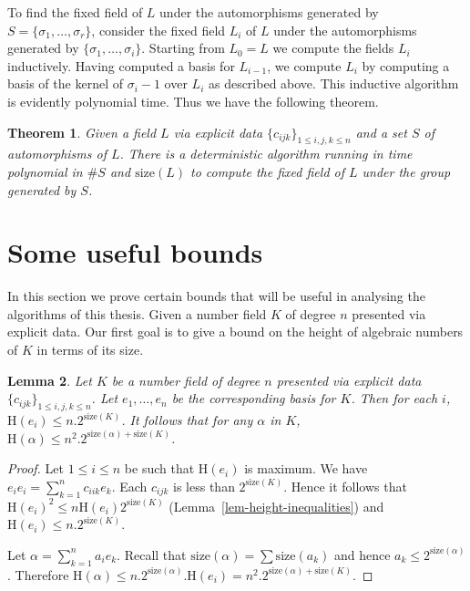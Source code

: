 \documentclass[11pt]{madras}%
\newtheorem{theorem}{Theorem}[chapter]
\newtheorem{lemma}[theorem]{Lemma}
\theoremstyle{remark}
\newcommand{\size}[1]{{\ensuremath{\mathrm{size}\left(#1\right)}}}
\newcommand{\Height}[1]{\ensuremath{\mathrm{H}\left(#1\right)}}
\begin{document}
To find the fixed field of $L$ under the automorphisms generated by
$S= \{ \sigma_1,\ldots,\sigma_r \}$, consider the fixed field $L_i$ of
$L$ under the automorphisms generated by $\{ \sigma_1,\ldots,\sigma_i
\}$. Starting from $L_0 = L$ we compute the fields $L_i$ inductively.
Having computed a basis for $L_{i-1}$, we compute $L_i$ by computing a
basis of the kernel of $\sigma_i - 1$ over $L_i$ as described above.
This inductive algorithm is evidently polynomial time.  Thus we have
the following theorem.

\begin{theorem}\label{thm-compute-fixed-field}
  Given a field $L$ via explicit data $\{ c_{ijk} \}_{1 \leq i,j,k
    \leq n}$ and a set $S$ of automorphisms of $L$. There is a
  deterministic algorithm running in time polynomial in $\# S$ and
  $\size{L}$ to compute the fixed field of $L$ under the group
  generated by $S$.
\end{theorem}
\section{Some useful bounds}\label{sect-bounds-ant}

In this section we prove certain bounds that will be useful in
analysing the algorithms of this thesis. Given a number field $K$ of
degree $n$ presented via explicit data.  Our first goal is to give a
bound on the height of algebraic numbers of $K$ in terms of its size.

\begin{lemma} 
  Let $K$ be a number field of degree $n$ presented via explicit data
  $\{c_{ijk}\}_{1 \leq i,j,k \leq n}$. Let $e_1,\ldots,e_n$ be the
  corresponding basis for $K$. Then for each $i$, $\Height{e_i} \leq
  n. 2^{\size{K}}$. It follows that for any $\alpha$ in $K$,
  $\Height{\alpha} \leq n^2. 2^{\size{\alpha} + \size{K}}$.
\end{lemma}
\begin{proof}
  Let $1 \leq i \leq n$ be such that $\Height{e_i}$ is maximum. We
  have $e_i e_i = \sum_{k=1}^n c_{iik} e_k$. Each $c_{ijk}$ is less
  than $2^{\size{K}}$. Hence it follows that $\Height{e_i}^2 \leq n
  \Height{e_i} 2^\size{K}$ (Lemma~\ref{lem-height-inequalities}) and
  $\Height{e_i} \leq n . 2^{\size{K}}$.

  Let $\alpha = \sum_{k=1}^n a_i e_k$. Recall that $\size{\alpha} =
  \sum \size{a_k}$ and hence $a_k \leq 2^\size{\alpha}$. Therefore
  $\Height{\alpha} \leq n . 2^{\size{\alpha}} .  \Height{e_i} = n^2 .
  2^{\size{\alpha} + \size{K}}$.
\end{proof}
\end{document}
